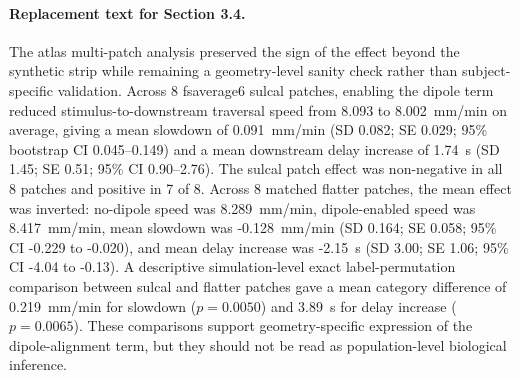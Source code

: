 \begin{table}[t]
\centering
\small
\caption{Summary statistics for the atlas-patch sanity check. Values are mean $\pm$ SD unless otherwise stated; bootstrap intervals are percentile 95\% CIs for the category mean.}
\label{tab:atlas-patch-summary}
\end{table}

\paragraph{Replacement text for Section 3.4.}
The atlas multi-patch analysis preserved the sign of the effect beyond the synthetic strip while remaining a geometry-level sanity check rather than subject-specific validation. Across 8 fsaverage6 sulcal patches, enabling the dipole term reduced stimulus-to-downstream traversal speed from 8.093 to 8.002~mm/min on average, giving a mean slowdown of 0.091~mm/min (SD 0.082; SE 0.029; 95\% bootstrap CI 0.045--0.149) and a mean downstream delay increase of 1.74~s (SD 1.45; SE 0.51; 95\% CI 0.90--2.76). The sulcal patch effect was non-negative in all 8 patches and positive in 7 of 8. Across 8 matched flatter patches, the mean effect was inverted: no-dipole speed was 8.289~mm/min, dipole-enabled speed was 8.417~mm/min, mean slowdown was -0.128~mm/min (SD 0.164; SE 0.058; 95\% CI -0.229 to -0.020), and mean delay increase was -2.15~s (SD 3.00; SE 1.06; 95\% CI -4.04 to -0.13). A descriptive simulation-level exact label-permutation comparison between sulcal and flatter patches gave a mean category difference of 0.219~mm/min for slowdown ($p=0.0050$) and 3.89~s for delay increase ($p=0.0065$). These comparisons support geometry-specific expression of the dipole-alignment term, but they should not be read as population-level biological inference.
